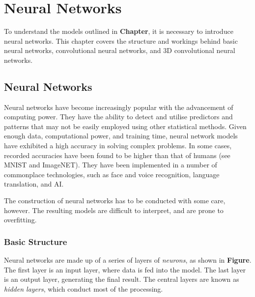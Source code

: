 %
%

\chapter{Neural Networks}\label{neuralNets-intro}

To understand the models outlined in \textbf{Chapter}, it is necessary to introduce neural networks. This chapter covers the structure and workings behind basic neural networks, convolutional neural networks, and 3D convolutional neural networks.

% 
% 

\section{Neural Networks}\label{nnets}

Neural networks have become increasingly popular with the advancement of computing power. They have the ability to detect and utilise predictors and patterns that may not be easily employed using other statistical methods. Given enough data, computational power, and training time, neural network models have exhibited a high accuracy in solving complex problems. In some cases, recorded accuracies have been found to be higher than that of humans (see MNIST and ImageNET). They have been implemented in a number of commonplace technologies, such as face and voice recognition, language translation, and AI.

The construction of neural networks has to be conducted with some care, however. The resulting models are difficult to interpret, and are prone to overfitting. 

\subsection{Basic Structure}\label{nnets-structure}

Neural networks are made up of a series of layers of \textit{neurons}, as shown in \textbf{Figure}. The first layer is an input layer, where data is fed into the model. The last layer is an output layer, generating the final result. The central layers are known as \textit{hidden layers}, which conduct most of the processing.

